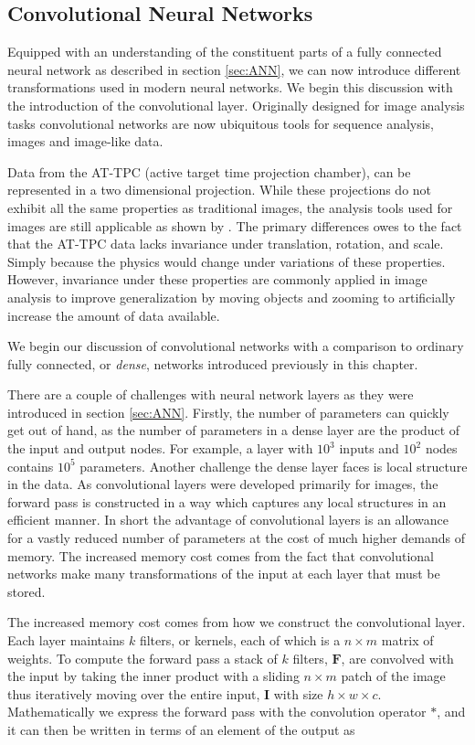 \subsection{Convolutional Neural Networks}\label{sec:cnn}

Equipped with an understanding of the constituent parts of a fully connected neural network as described in section \ref{sec:ANN}, we can now introduce different transformations used in modern neural networks. We begin this discussion with the introduction of the convolutional layer. Originally designed for image analysis tasks convolutional networks are now ubiquitous tools for sequence analysis, images and image-like data. 

Data from the AT-TPC (active target time projection chamber), can be represented in a two dimensional projection. While these projections do not exhibit all the same properties as traditional images, the analysis tools used for images are still applicable as shown by \citet{Kuchera2019}. The primary differences owes to the fact that the AT-TPC data lacks invariance under translation, rotation, and scale. Simply because the physics would change under variations of these properties. However, invariance under these properties are commonly applied in image analysis to improve generalization by moving objects and zooming to artificially increase the amount of data available.

We begin our discussion of convolutional networks with a comparison to ordinary fully connected, or \textit{dense}, networks introduced previously in this chapter.

There are a couple of challenges with neural network layers as they were introduced in section \ref{sec:ANN}. Firstly, the number of parameters can quickly get out of hand, as the number of parameters in a dense layer are the product of the input and output nodes. For example, a layer with $10^3$ inputs and $10^2$ nodes contains $10^5$ parameters. Another challenge the dense layer faces is local structure in the data. As convolutional layers were developed primarily for images, the forward pass is constructed in a way which captures any local structures in an efficient manner. In short the advantage of convolutional layers is an allowance for a vastly reduced number of parameters at the cost of much higher demands of memory. The increased memory cost comes from the fact that convolutional networks make many transformations of the input at each layer that must be stored.

The increased memory cost comes from how we construct the convolutional layer. Each layer maintains $k$ filters, or kernels, each of which is a $n\times m$ matrix of weights. To compute the forward pass a stack of $k$ filters, $\mathbf{F}$, are convolved with the input by taking the inner product with a sliding $n\times m$ patch of the image thus iteratively moving over the entire input, $\mathbf{I}$ with size $h \times w \times c$. Mathematically we express the forward pass with the convolution operator $*$, and it can then be written in terms of an element of the output as

